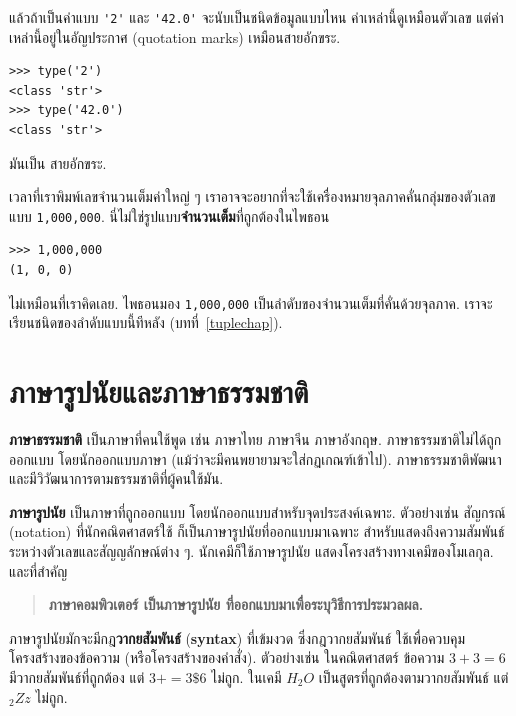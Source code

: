 แล้วถ้าเป็นค่าแบบ \verb"'2'" และ \verb"'42.0'" จะนับเป็นชนิดข้อมูลแบบไหน
ค่าเหล่านี้ดูเหมือนตัวเลข
แต่ค่าเหล่านี้อยู่ในอัญประกาศ (quotation marks) เหมือนสายอักขระ.

\begin{verbatim}
>>> type('2')
<class 'str'>
>>> type('42.0')
<class 'str'>
\end{verbatim}
%
มันเป็น สายอักขระ.

เวลาที่เราพิมพ์เลขจำนวนเต็มค่าใหญ่ ๆ
เราอาจจะอยากที่จะใช้เครื่องหมายจุลภาคคั่นกลุ่มของตัวเลข แบบ \texttt{1,000,000}.  
นี่ไม่ใช่รูปแบบ\textbf{จำนวนเต็ม}ที่ถูกต้องในไพธอน

\begin{verbatim}
>>> 1,000,000
(1, 0, 0)
\end{verbatim}
%
ไม่เหมือนที่เราคิดเลย. 
ไพธอนมอง \texttt{1,000,000} 
เป็นลำดับของจำนวนเต็มที่คั่นด้วยจุลภาค. 
เราจะเรียนชนิดของลำดับแบบนี้ทีหลัง (บทที่~\ref{tuplechap}).


\section{ภาษารูปนัยและภาษาธรรมชาติ}

\textbf{ภาษาธรรมชาติ} เป็นภาษาที่คนใช้พูด เช่น ภาษาไทย ภาษาจีน ภาษาอังกฤษ.
ภาษาธรรมชาติไม่ได้ถูกออกแบบ โดยนักออกแบบภาษา (แม้ว่าจะมีคนพยายามจะใส่กฏเกณฑ์เข้าไป).
ภาษาธรรมชาติพัฒนาและมีวิวัฒนาการตามธรรมชาติที่ผู้คนใช้มัน.

\textbf{ภาษารูปนัย} เป็นภาษาที่ถูกออกแบบ โดยนักออกแบบสำหรับจุดประสงค์เฉพาะ.
ตัวอย่างเช่น สัญกรณ์ (notation) ที่นักคณิตศาสตร์ใช้
ก็เป็นภาษารูปนัยที่ออกแบบมาเฉพาะ 
สำหรับแสดงถึงความสัมพันธ์ระหว่างตัวเลขและสัญญลักษณ์ต่าง ๆ.
นักเคมีก็ใช้ภาษารูปนัย แสดงโครงสร้างทางเคมีของโมเลกุล.
และที่สำคัญ

\begin{quote}
\textbf{ภาษาคอมพิวเตอร์ เป็นภาษารูปนัย
ที่ออกแบบมาเพื่อระบุวิธีการประมวลผล.}
\end{quote}

ภาษารูปนัยมักจะมีกฎ\textbf{วากยสัมพันธ์} (\textbf{syntax}) ที่เข้มงวด 
ซึ่งกฎวากยสัมพันธ์ ใช้เพื่อควบคุมโครงสร้างของข้อความ (หรือโครงสร้างของคำสั่ง). 
ตัวอย่างเช่น ในคณิตศาสตร์ ข้อความ
$3 + 3 = 6$ มีวากยสัมพันธ์ที่ถูกต้อง
แต่
$3 + = 3 \$ 6$ ไม่ถูก.  
ในเคมี
$H_2O$ 
เป็นสูตรที่ถูกต้องตามวากยสัมพันธ์
แต่ $_2Zz$ ไม่ถูก.

